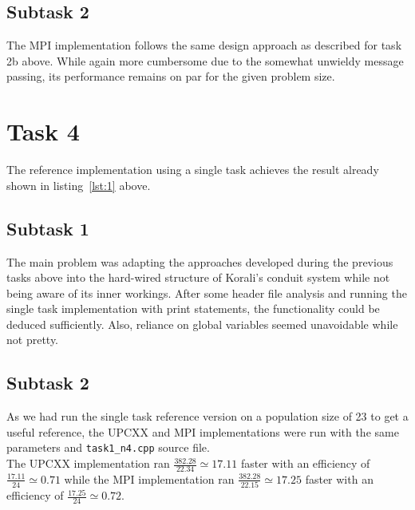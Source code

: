 \documentclass[11pt,a4paper]{article}
\begin{document}
\subsection{Subtask 2}
The MPI implementation follows the same design approach as described for task 2b above. 
While again more cumbersome due to the somewhat unwieldy message passing, its performance remains on par
for the given problem size.



\section{Task 4}

The reference implementation using a single task achieves the result already shown in listing~\ref{lst:1} above.

\subsection{Subtask 1}
The main problem was adapting the approaches developed during the previous tasks above
into the hard-wired structure of Korali's conduit system while not being aware of its inner workings.
After some header file analysis and running the single task implementation with print statements,
the functionality could be deduced sufficiently. Also, reliance on global variables seemed unavoidable while not pretty.


\subsection{Subtask 2}
As we had run the single task reference version on a population size of 23 to get a useful reference, the UPCXX and MPI
implementations were run with the same parameters and \texttt{task1\_n4.cpp} source file.\\
The UPCXX implementation ran $\frac{382.28}{22.34}\simeq 17.11$ faster with an efficiency of $\frac{17.11}{24}\simeq 0.71$ while
the MPI implementation ran $\frac{382.28}{22.15}\simeq 17.25$ faster with an efficiency of $\frac{17.25}{24}\simeq 0.72$.
\end{document}
